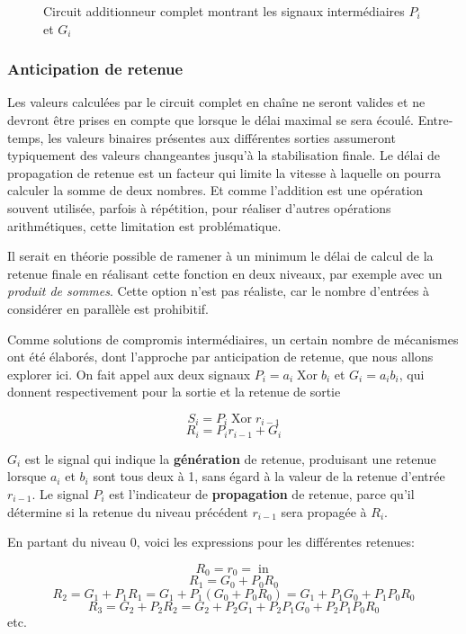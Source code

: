 \documentclass[11pt]{article}
\begin{document}
\begin{figure}[htbp]
\centering

\caption{\label{fig:org2c1402d}Circuit additionneur complet montrant les signaux intermédiaires \(P_i\) et \(G_i\)}
\end{figure}

\subsubsection{Anticipation de retenue}
\label{sec:orge5667a5}

Les valeurs calculées par le circuit complet en chaîne ne seront
valides et ne devront être prises en compte que lorsque le délai
maximal se sera écoulé. Entre-temps, les valeurs binaires présentes
aux différentes sorties assumeront typiquement des valeurs changeantes
jusqu'à la stabilisation finale. Le délai de propagation de retenue est
un facteur qui limite la vitesse à laquelle on pourra calculer la
somme de deux nombres. Et comme l'addition est une opération 
souvent utilisée, parfois à répétition, pour réaliser d'autres
opérations arithmétiques, cette limitation est problématique. 

Il serait en théorie possible de ramener à un minimum le délai de
calcul de la retenue finale en réalisant cette fonction en deux
niveaux, par exemple avec un \emph{produit de sommes}. Cette option n'est pas
réaliste, car le nombre d'entrées à considérer en parallèle est prohibitif.

Comme solutions de compromis intermédiaires, un certain nombre de
mécanismes ont été élaborés, dont l'approche par anticipation de
retenue, que nous allons explorer ici. On fait appel aux deux signaux
\(P_i = a_i \operatorname{Xor} b_i\) et \(G_i = a_i b_i\), qui donnent
respectivement pour la sortie et la retenue de sortie

$$ S_i = P_i \operatorname{Xor} r_{i-1} $$
$$ R_i = P_i r_{i-1} + G_i $$

\(G_i\) est le signal qui indique la \textbf{génération} de retenue,
produisant une retenue lorsque \(a_i\) et \(b_i\) sont tous deux à 1,
sans égard à la valeur de la retenue d'entrée \(r_{i-1}\). Le signal
\(P_i\) est l'indicateur de \textbf{propagation} de retenue, parce qu'il
détermine si la retenue du niveau précédent \(r_{i-1}\) sera propagée
à \(R_i\).

En partant du niveau 0, voici les expressions pour les différentes retenues:

$$ R_0 = r_0 = \operatorname{in}$$
$$ R_1 = G_0 + P_0 R_0 $$
$$ R_2 = G_1 + P_1 R_1 = G_1 + P_1 (G_0 + P_0 R_0) = G_1 + P_1 G_0 + P_1 P_0 R_0 $$
$$ R_3 = G_2 + P_2 R_2 = G_2 + P_2 G_1 + P_2 P_1 G_0 + P_2 P_1 P_0 R_0 $$
etc.
\end{document}
